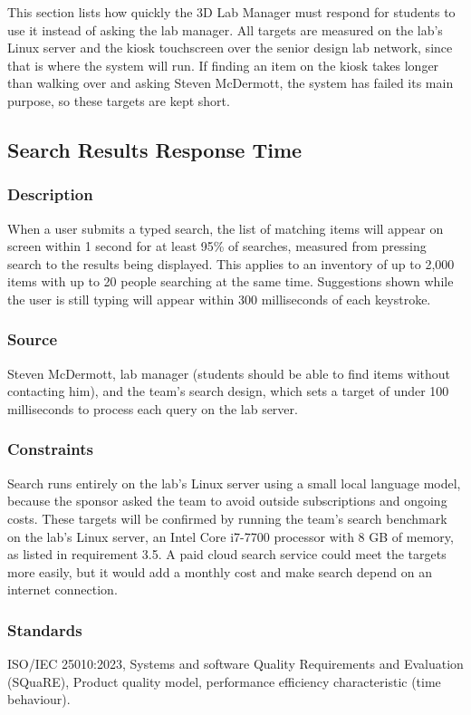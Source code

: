 This section lists how quickly the 3D Lab Manager must respond for students to use it instead of asking the lab manager. All targets are measured on the lab's Linux server and the kiosk touchscreen over the senior design lab network, since that is where the system will run. If finding an item on the kiosk takes longer than walking over and asking Steven McDermott, the system has failed its main purpose, so these targets are kept short.

\subsection{Search Results Response Time}
\subsubsection{Description}
When a user submits a typed search, the list of matching items will appear on screen within 1 second for at least 95\% of searches, measured from pressing search to the results being displayed. This applies to an inventory of up to 2,000 items with up to 20 people searching at the same time. Suggestions shown while the user is still typing will appear within 300 milliseconds of each keystroke.
\subsubsection{Source}
Steven McDermott, lab manager (students should be able to find items without contacting him), and the team's search design, which sets a target of under 100 milliseconds to process each query on the lab server.
\subsubsection{Constraints}
Search runs entirely on the lab's Linux server using a small local language model, because the sponsor asked the team to avoid outside subscriptions and ongoing costs. These targets will be confirmed by running the team's search benchmark on the lab's Linux server, an Intel Core i7-7700 processor with 8 GB of memory, as listed in requirement 3.5. A paid cloud search service could meet the targets more easily, but it would add a monthly cost and make search depend on an internet connection.
\subsubsection{Standards}
ISO/IEC 25010:2023, Systems and software Quality Requirements and Evaluation (SQuaRE), Product quality model, performance efficiency characteristic (time behaviour).
